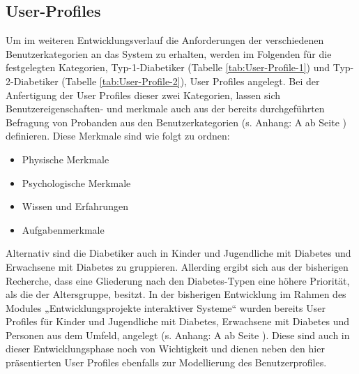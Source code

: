 \documentclass[a4paper,11pt]{article}%
\renewcommand{\\}{\vspace*{0.5\baselineskip} \newline}
\begin{document}
\subsection{User-Profiles}
	Um im weiteren Entwicklungsverlauf die Anforderungen der verschiedenen Benutzerkategorien an das System zu erhalten, werden im Folgenden für die festgelegten Kategorien, Typ-1-Diabetiker (Tabelle \ref{tab:User-Profile-1}) und Typ-2-Diabetiker (Tabelle \ref{tab:User-Profile-2}), User Profiles angelegt. Bei der Anfertigung der User Profiles dieser zwei Kategorien, lassen sich Benutzereigenschaften- und merkmale auch aus der bereits durchgeführten Befragung von Probanden aus den Benutzerkategorien (s. Anhang: A  ab Seite \pageref{section:Evaluation}) definieren. Diese Merkmale sind wie folgt zu ordnen:
	\begin{itemize}
		\item Physische Merkmale
		\item Psychologische Merkmale
		\item Wissen und Erfahrungen
		\item Aufgabenmerkmale
	\end{itemize}
	Alternativ sind die Diabetiker auch in Kinder und Jugendliche mit Diabetes und Erwachsene mit Diabetes zu gruppieren. Allerding ergibt sich aus der bisherigen Recherche, dass eine Gliederung nach den Diabetes-Typen eine höhere Priorität, als die der Altersgruppe, besitzt. In der bisherigen Entwicklung im Rahmen des Modules „Entwicklungsprojekte interaktiver Systeme“ wurden bereits User Profiles für Kinder und Jugendliche mit Diabetes, Erwachsene mit Diabetes und Personen aus dem Umfeld, angelegt (s. Anhang: A  ab Seite \pageref{section:Profiles}). Diese sind auch in dieser Entwicklungsphase noch von Wichtigkeit und dienen neben den hier präsentierten User Profiles ebenfalls zur Modellierung des Benutzerprofiles.
\end{document}
